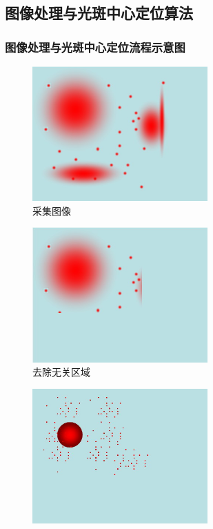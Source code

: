 \documentclass{beamer}
\begin{document}
\subsection{图像处理与光斑中心定位算法}

\begin{frame}
  \frametitle{图像处理与光斑中心定位流程示意图}
  \begin{overprint}
    \begin{figure}
    \center
    \includegraphics[width=0.6\textwidth]{image/spot1}
    \caption{采集图像}
    \end{figure}
    \begin{figure}
    \center
    \includegraphics[width=0.6\textwidth]{image/spot2}
    \caption{去除无关区域}
    \end{figure}
    \begin{figure}
    \center
    \includegraphics[width=0.6\textwidth]{image/spot3}

\end{figure}
\end{overprint}
\end{frame}
\end{document}
